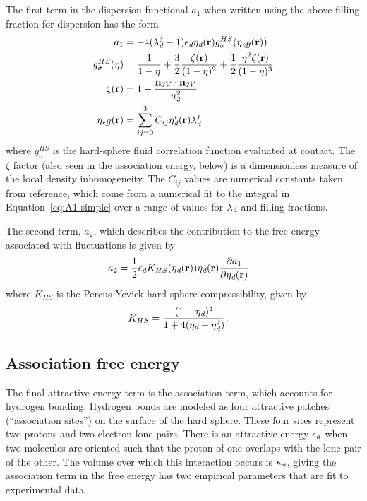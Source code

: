 \documentclass[letterpaper,twocolumn,amsmath,amssymb,prb]{revtex4-1}
\newcommand{\xx}{\textbf{r}}
\begin{document}
The first term in the dispersion functional $a_1$ when written using
the above filling fraction for dispersion has the form
\begin{align}
  a_1 &= 
   -4(\lambdadisp^3 - 1)\epsilondisp \etadisp(\xx)
    g^{HS}_\sigma(\eta_\textit{eff}(\xx)) \\
  g_\sigma^{HS}(\eta) &= \frac{1}{1-\eta}
  +\frac32\frac{\zeta(\xx)}{(1-\eta)^2}
  + \frac12\frac{\eta^2\zeta(\xx)}{(1-\eta)^3}
  \\
  \zeta(\xx) &= 1 - \frac{\mathbf{n}_{2V}\cdot\mathbf{n}_{2V}}{n_2^2}\\
  \eta_\textit{eff}(\xx) &= \sum_{ij=0}^3 C_{ij}  \etadisp^i(\xx)
  \lambdadisp^j
\end{align}
where $g_\sigma^{HS}$
is the hard-sphere fluid correlation function evaluated at contact.
The $\zeta$ factor
(also seen in the association energy, below) is a dimensionless
measure of the local density inhomogeneity. The $C_{ij}$ values
 are numerical constants taken from
reference\cite{gil-villegas-1997-SAFT-VR}, which come from a numerical
fit to the integral in Equation~\ref{eq:A1-simple} over a range of
values for $\lambda_\textit{d}$ and filling fractions.

The second term, $a_2$, which describes the contribution to the free
energy associated with fluctuations is given by
\begin{align}
  a_2 &= \frac12 \epsilondisp
              K_{HS}(\etadisp(\xx)) \etadisp(\xx)
              \frac{\partial a_1}{\partial \etadisp(\xx)}
\end{align}
where $K_{HS}$ is the Percus-Yevick hard-sphere compressibility, given
by
\begin{align}
  K_{HS} &=
    \frac{(1 - \eta_\textit{d})^4}{1 + 4(\eta_\textit{d} + \eta_\textit{d}^2)}.
\end{align}

\subsection{Association free energy}
The final attractive energy term is the association term, which
accounts for hydrogen bonding.  Hydrogen bonds are modeled as four
attractive patches (``association sites'') on the surface of the hard
sphere.  These four sites represent two protons and two electron lone
pairs.  There is an attractive energy $\epsilon_\textit{a}$ when
two molecules are oriented such that the proton of one overlaps
with the lone pair of the other.  The volume over which this
interaction occurs is $\kappa_\textit{a}$, giving the association
term in the free energy has two empirical parameters that are fit to
experimental data.
\end{document}
